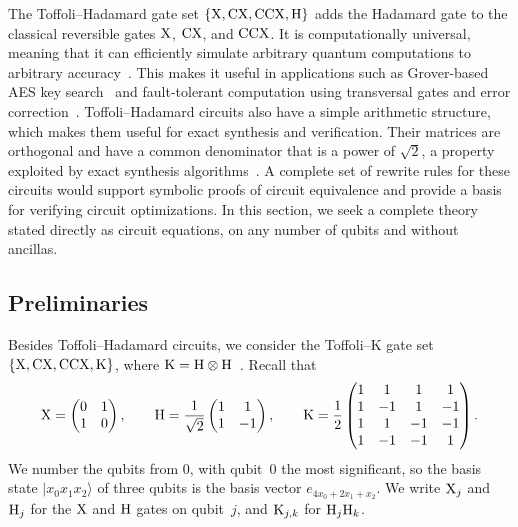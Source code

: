 \documentclass[acmsmall,screen,nonacm]{acmart}
\begin{document}
The Toffoli--Hadamard gate set $\{\mathrm{X},\mathrm{CX},\mathrm{CCX},\mathrm{H}\}$ adds the Hadamard gate to the classical reversible gates $\mathrm{X}$, $\mathrm{CX}$, and $\mathrm{CCX}$. It is computationally universal, meaning that it can efficiently simulate arbitrary quantum computations to arbitrary accuracy~\cite{shi2003both,aharonov2003simple}. This makes it useful in applications such as Grover-based AES key search~\cite{grassl2016applying} and fault-tolerant computation using transversal gates and error correction~\cite{paetznick2013universal}. Toffoli--Hadamard circuits also have a simple arithmetic structure, which makes them useful for exact synthesis and verification. Their matrices are orthogonal and have a common denominator that is a power of $\sqrt2$, a property exploited by exact synthesis algorithms~\cite{amy2020numbertheoretic,amy2023improved}. A complete set of rewrite rules for these circuits would support symbolic proofs of circuit equivalence and provide a basis for verifying circuit optimizations. In this section, we seek a complete theory stated directly as circuit equations, on any number of qubits and without ancillas.

\subsection{Preliminaries}
\label{sec:preliminaries}

Besides Toffoli--Hadamard circuits, we consider the Toffoli--K gate set $\{\mathrm{X}, \mathrm{CX}, \mathrm{CCX}, \mathrm{K}\}$, where $\mathrm{K} = \mathrm{H}\otimes\mathrm{H}$~\cite{amy2020numbertheoretic,li2021on,amy2024toffoli}. Recall that
\[
\mathrm{X} = \begin{pmatrix} 0 & 1 \\ 1 & 0 \end{pmatrix}, \qquad
\mathrm{H} = \frac{1}{\sqrt2}\begin{pmatrix} 1 & 1 \\ 1 & -1 \end{pmatrix}, \qquad
\mathrm{K} = \frac{1}{2}\begin{pmatrix} 1 & 1 & 1 & 1 \\ 1 & -1 & 1 & -1 \\ 1 & 1 & -1 & -1 \\ 1 & -1 & -1 & 1 \end{pmatrix}.
\]
We number the qubits from $0$, with qubit~$0$ the most significant, so the basis state $\lvert x_0x_1x_2\rangle$ of three qubits is the basis vector $e_{4x_0+2x_1+x_2}$. We write $\mathrm{X}_j$ and $\mathrm{H}_j$ for the $\mathrm{X}$ and $\mathrm{H}$ gates on qubit~$j$, and $\mathrm{K}_{j,k}$ for $\mathrm{H}_j\mathrm{H}_k$.
\end{document}
